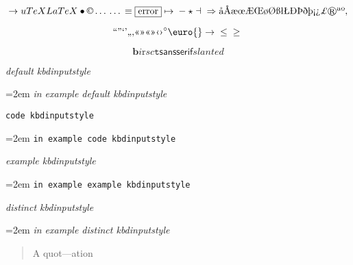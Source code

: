 \documentclass{book}
\begin{document}
$$
\rightarrow{}
u
TeX LaTeX \bullet{} \copyright{} \dots{} \dots{} \equiv{}
\fbox{error} \mapsto{} - \star{} \dashv{} \Rightarrow{}
\mathord{\text{\aa{}}} \mathord{\text{\AA{}}} \mathord{\text{\ae{}}} \mathord{\text{\oe{}}} \mathord{\text{\AE{}}} \mathord{\text{\OE{}}} \mathord{\text{\o{}}} \mathord{\text{\O{}}} \mathord{\text{\ss{}}} \mathord{\text{\l{}}} \mathord{\text{\L{}}} \mathord{\text{\DH{}}}
\mathord{\text{\TH{}}} \mathord{\text{\dh{}}} \mathord{\text{\th{}}} \mathord{\text{\textexclamdown{}}} \mathord{\text{\textquestiondown{}}} \mathsterling{}
\circledR{} \mathord{\text{\textordfeminine{}}} \mathord{\text{\textordmasculine{}}} , 
$$

$$
\mathord{\text{\textquotedblleft{}}} \mathord{\text{\textquotedblright{}}} 
\mathord{\text{\textquoteleft{}}} \mathord{\text{\textquoteright{}}} \mathord{\text{\quotedblbase{}}} \mathord{\text{\quotesinglbase{}}} \mathord{\text{\guillemotleft{}}}
\mathord{\text{\guillemotright{}}} \mathord{\text{\guillemotleft{}}} \mathord{\text{\guillemotright{}}} \mathord{\text{\guilsinglleft{}}}
\mathord{\text{\guilsinglright{}}} ^{\circ{}} \euro{} \rightarrow{} \leq{} \geq{}
$$

$$
\mathbf{b} \mathit{i} \mathrm{r} sc \mathtt{t} \mathsf{sansserif} slanted
$$

{\ttfamily\textsl{default kbdinputstyle}}
\par\begingroup\obeylines\obeyspaces\frenchspacing\leftskip=2em\relax\parskip=0pt\relax\ttfamily{}%
{\ttfamily\textsl{in example default kbdinputstyle}}
\endgroup{}%

\texttt{code kbdinputstyle}
\par\begingroup\obeylines\obeyspaces\frenchspacing\leftskip=2em\relax\parskip=0pt\relax\ttfamily{}%
\texttt{in example code kbdinputstyle}
\endgroup{}%

{\ttfamily\textsl{example kbdinputstyle}}
\par\begingroup\obeylines\obeyspaces\frenchspacing\leftskip=2em\relax\parskip=0pt\relax\ttfamily{}%
\texttt{in example example kbdinputstyle}
\endgroup{}%

{\ttfamily\textsl{distinct kbdinputstyle}}
\par\begingroup\obeylines\obeyspaces\frenchspacing\leftskip=2em\relax\parskip=0pt\relax\ttfamily{}%
{\ttfamily\textsl{in example distinct kbdinputstyle}}
\endgroup{}%

\begin{quote}
A quot---ation
\end{quote}
\end{document}
